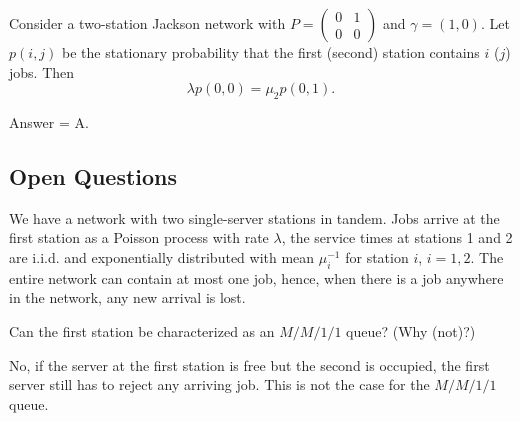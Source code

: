 \begin{exercise}[201907]
  Consider a two-station Jackson network with $P=
  \begin{pmatrix}
    0 &1 \\
    0 & 0
  \end{pmatrix}$ and $\gamma = (1, 0)$.
  Let $p(i,j)$ be the stationary probability that the first (second) station contains $i$ ($j$) jobs.
  Then
  \begin{equation*}
    \lambda p(0, 0) = \mu_2 p(0, 1).
  \end{equation*}
\begin{solution}
Answer = A.
\end{solution}
\end{exercise}





\subsection{Open Questions}

We have a network with two single-server stations in tandem.
Jobs arrive at the first station as a Poisson process with rate $\lambda$, the service times at stations 1 and 2 are i.i.d.
and exponentially distributed with mean $\mu_i^{-1}$ for station $i$, $i=1,2$.
The entire network can contain at most one job, hence, when there is a job anywhere in the network, any new arrival is lost.



\begin{exercise}[201704]
  Can the first station be characterized as an $M/M/1/1$ queue? (Why (not)?)
\begin{solution}
    No, if the server at the first station is free but the second is occupied, the first server still has to reject any arriving job. This is not the case for the $M/M/1/1$ queue.
\end{solution}
\end{exercise}

